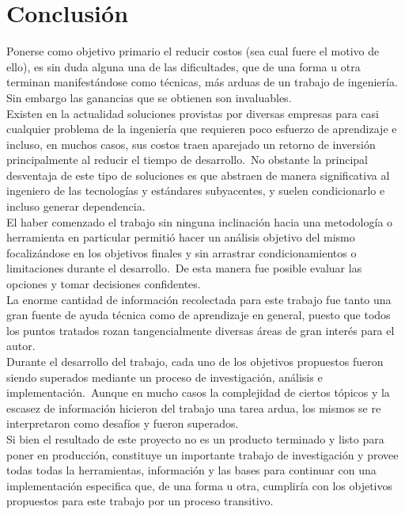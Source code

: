 \chapter{Conclusi\'on}

Ponerse como objetivo primario el reducir costos (sea cual fuere el motivo de
ello), es sin duda alguna una de las dificultades, que de una forma u otra
terminan manifest\'andose como t\'ecnicas, m\'as arduas de un trabajo de
ingenier\'ia. Sin embargo las ganancias que se obtienen son invaluables.\\

Existen en la actualidad soluciones provistas por diversas empresas para casi
cualquier problema de la ingenier\'ia que requieren poco esfuerzo de
aprendizaje e incluso, en muchos casos, sus costos traen aparejado un retorno
de inversi\'on principalmente al reducir el tiempo de desarrollo.\
No obstante la principal desventaja de este tipo de soluciones es que abstraen
de manera significativa al ingeniero de las tecnolog\'ias y est\'andares
subyacentes, y suelen condicionarlo e incluso generar dependencia.\\

El haber comenzado el trabajo sin ninguna inclinaci\'on hacia una metodolog\'ia
o herramienta en particular permiti\'o hacer un an\'alisis objetivo del mismo
focaliz\'andose en los objetivos finales y sin arrastrar condicionamientos
o limitaciones durante el desarrollo.\ 
De esta manera fue posible evaluar las opciones y tomar decisiones
confidentes.\\

La enorme cantidad de informaci\'on recolectada para este trabajo fue tanto una
gran fuente de ayuda t\'ecnica como de aprendizaje en general, puesto que
todos los puntos tratados rozan tangencialmente diversas \'areas de gran
inter\'es para el autor.\\

Durante el desarrollo del trabajo, cada uno de los objetivos propuestos fueron
siendo superados mediante un proceso de investigaci\'on, an\'alisis e
implementaci\'on.\
Aunque en mucho casos la complejidad de ciertos t\'opicos y la escasez de
informaci\'on hicieron del trabajo una tarea ardua, los mismos se re
interpretaron como desaf\'ios y fueron superados.\\

Si bien el resultado de este proyecto no es un producto terminado y listo para
poner en producci\'on, constituye un importante trabajo de investigaci\'on y
provee todas todas la herramientas, informaci\'on y las bases para continuar
con una implementaci\'on especifica que, de una forma u otra, cumplir\'ia con
los objetivos propuestos para este trabajo por un proceso transitivo.


